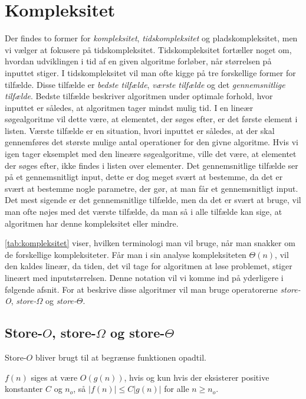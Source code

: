 \section{Kompleksitet} \label{kap:kompleksitet}

Der findes to former for \emph{kompleksitet}, \emph{tidskompleksitet} og pladskompleksitet, men vi vælger at fokusere på tidskompleksitet. 
Tidskompleksitet fortæller noget om, hvordan udviklingen i tid af en given algoritme forløber, når størrelsen på inputtet stiger. I tidskompleksitet vil man ofte kigge på tre forskellige former for tilfælde. Disse tilfælde er \emph{bedste tilfælde}, \emph{værste tilfælde} og det \emph{gennemsnitlige tilfælde}. 
Bedste tilfælde beskriver algoritmen under optimale forhold, hvor inputtet er således, at algoritmen tager mindst mulig tid. I en lineær søgealgoritme vil dette være, at elementet, der søges efter, er det første element i listen. 
Værste tilfælde er en situation, hvori inputtet er således, at der skal gennemføres det største mulige antal operationer for den givne algoritme. Hvis vi igen tager eksemplet med den lineære søgealgoritme, ville det være, at elementet der søges efter, ikke findes i listen over elementer.
Det gennemsnitlige tilfælde ser på et gennemsnitligt input, dette er dog meget svært at bestemme, da det er svært at bestemme nogle parametre, der gør, at man får et gennemsnitligt input.
Det mest sigende er det gennemsnitlige tilfælde, men da det er svært at bruge, vil man ofte nøjes med det værste tilfælde, da man så i alle tilfælde kan sige, at algoritmen har denne kompleksitet eller mindre.




\autoref{tab:kompleksitet} viser, hvilken terminologi man vil bruge, når man snakker om de forskellige kompleksiteter. Får man i sin analyse kompleksiteten $\Theta(n)$, vil den kaldes lineær, da tiden, det vil tage for algoritmen at løse problemet, stiger lineært med inputstørrelsen. Denne notation vil vi komme ind på yderligere i følgende afsnit.
For at beskrive disse algoritmer vil man bruge operatorerne \emph{store-O}, \emph{store-$\Omega$} og \emph{store-$\Theta$}. 
\subsection{Store-$O$, store-$\Omega$ og store-$\Theta$}
Store-$O$ bliver brugt til at begrænse funktionen opadtil. 

\begin{defn}
$f(n)$ siges at være $O(g(n))$, hvis og kun hvis der eksisterer positive konstanter $C$ og $n_o$, så $|f(n)| \leq C |g(n)|$ for alle $n \geq n_o$.
\end{defn}


